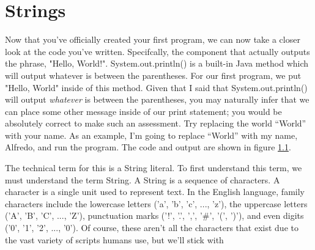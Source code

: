 

\chapter{Strings}


Now that you've officially created your first program, we can now take a closer look at the code you've written.
Specifcally, the component that actually outputs the phrase, "Hello, World!".
System.out.println() is a built-in Java method which will output whatever is between the parentheses.
For our first program, we put "Hello, World" inside of this method.
Given that I said that System.out.println() will output \textit{whatever} is between the parentheses, you may naturally infer that we can place some other message inside of our print statement; you would be absolutely correct to make such an assessment.
Try replacing the world ``World'' with your name.
As an example, I'm going to replace ``World'' with my name, Alfredo, and run the program.
The code and output are shown in figure \ref{fig:hello_alfredo}.

The technical term for this is a \gls{String literal}.
To first understand this term, we must understand the term \gls{String}.
A String is a sequence of characters.
A \gls{character} is a single unit used to represent text.
In the English language, family characters include the lowercase letters ('a', 'b', 'c', ..., 'z'), the uppercase letters ('A', 'B', 'C', ..., 'Z'), punctuation marks ('!', '.', ',', '\#', '(', ')'), and even digits ('0', '1', '2', ..., '0').
Of course, these aren't all the characters that exist due to the vast variety of scripts humans use, but we'll stick with 




\begin{figure}
  \label{fig:hello_alfredo}
\end{figure}
